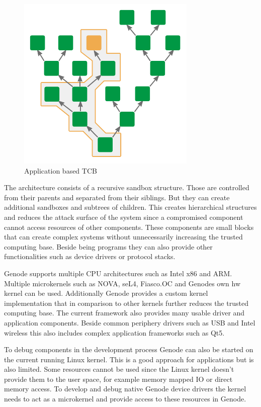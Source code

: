 \documentclass[
a4paper,
11pt,
twoside
]{report}
\begin{document}
		\begin{figure}
			\centering
			\includegraphics{per_app_tcb.pdf}
			\caption{Application based TCB \citep{genode}}
			\label{fig:tcb_tree}
		\end{figure}
		
		The architecture consists of a recursive sandbox structure.
		Those are controlled from their parents and separated from their siblings.
		But they can create additional sandboxes and subtrees of children.
		This creates hierarchical structures and reduces the attack surface of the system since a compromised component cannot access resources of other components.
		These components are small blocks that can create complex systems without unnecessarily increasing the trusted computing base.
		Beside being programs they can also provide other functionalities such as device drivers or protocol stacks.
		
		Genode supports multiple CPU architectures such as Intel x86 and ARM.
		Multiple microkernels such as NOVA, seL4, Fiasco.OC and Genodes own hw kernel can be used.
		Additionally Genode provides a custom kernel implementation that in comparison to other kernels further reduces the trusted computing base.
		The current framework also provides many usable driver and application components.
		Beside common periphery drivers such as USB and Intel wireless this also includes complex application frameworks such as Qt5. \citep{genode}
		
		To debug components in the development process Genode can also be started on the current running Linux kernel.
		This is a good approach for applications but is also limited.
		Some resources cannot be used since the Linux kernel doesn't provide them to the user space, for example memory mapped IO or direct memory access.
		To develop and debug native Genode device drivers the kernel needs to act as a microkernel and provide access to these resources in Genode.
		
\end{document}
